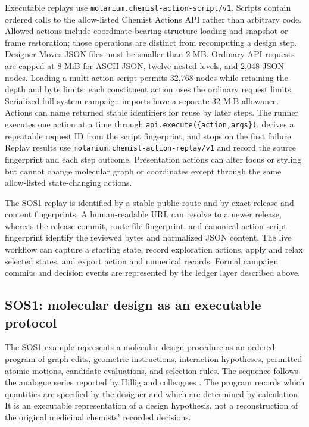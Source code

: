 \documentclass[11pt]{article}
\begin{document}
\begin{small}
Executable replays use \texttt{molarium.chemist-action-script/v1}. Scripts contain ordered calls to the allow-listed Chemist Actions API rather than arbitrary code. Allowed actions include coordinate-bearing structure loading and snapshot or frame restoration; those operations are distinct from recomputing a design step. Designer Moves JSON files must be smaller than 2 MB. Ordinary API requests are capped at 8 MiB for ASCII JSON, twelve nested levels, and 2,048 JSON nodes. Loading a multi-action script permits 32,768 nodes while retaining the depth and byte limits; each constituent action uses the ordinary request limits. Serialized full-system campaign imports have a separate 32 MiB allowance. Actions can name returned stable identifiers for reuse by later steps. The runner executes one action at a time through \texttt{api.execute(\{action,args\})}, derives a repeatable request ID from the script fingerprint, and stops on the first failure. Replay results use \texttt{molarium.chemist-action-replay/v1} and record the source fingerprint and each step outcome. Presentation actions can alter focus or styling but cannot change molecular graph or coordinates except through the same allow-listed state-changing actions.

The SOS1 replay is identified by a stable public route and by exact release and content fingerprints. A human-readable URL can resolve to a newer release, whereas the release commit, route-file fingerprint, and canonical action-script fingerprint identify the reviewed bytes and normalized JSON content. The live workflow can capture a starting state, record exploration actions, apply and relax selected states, and export action and numerical records. Formal campaign commits and decision events are represented by the ledger layer described above.

\subsection{SOS1: molecular design as an executable protocol}

The SOS1 example represents a molecular-design procedure as an ordered program of graph edits, geometric instructions, interaction hypotheses, permitted atomic motions, candidate evaluations, and selection rules. The sequence follows the analogue series reported by Hillig and colleagues \citep{hillig2019sos1}. The program records which quantities are specified by the designer and which are determined by calculation. It is an executable representation of a design hypothesis, not a reconstruction of the original medicinal chemists' recorded decisions.


\end{small}
\end{document}
